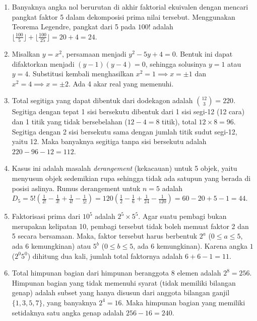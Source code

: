 \documentclass{article}
\begin{document}
\begin{enumerate}
\item Banyaknya angka nol berurutan di akhir faktorial ekuivalen dengan mencari pangkat faktor 5 dalam dekomposisi prima nilai tersebut. Menggunakan Teorema Legendre, pangkat dari 5 pada $100!$ adalah $\lfloor \frac{100}{5} \rfloor + \lfloor \frac{100}{25} \rfloor = 20 + 4 = 24$.

\item Misalkan $y = x^2$, persamaan menjadi $y^2 - 5y + 4 = 0$. Bentuk ini dapat difaktorkan menjadi $(y-1)(y-4) = 0$, sehingga solusinya $y = 1$ atau $y = 4$. Substitusi kembali menghasilkan $x^2 = 1 \implies x = \pm 1$ dan $x^2 = 4 \implies x = \pm 2$. Ada 4 akar real yang memenuhi.

\item Total segitiga yang dapat dibentuk dari dodekagon adalah $\binom{12}{3} = 220$. 
Segitiga dengan tepat 1 sisi bersekutu dibentuk dari 1 sisi segi-12 (12 cara) dan 1 titik yang tidak bersebelahan ($12-4=8$ titik), total $12 \times 8 = 96$. 
Segitiga dengan 2 sisi bersekutu sama dengan jumlah titik sudut segi-12, yaitu 12. 
Maka banyaknya segitiga tanpa sisi bersekutu adalah $220 - 96 - 12 = 112$.

\item Kasus ini adalah masalah \textit{derangement} (kekacauan) untuk 5 objek, yaitu menyusun objek sedemikian rupa sehingga tidak ada satupun yang berada di posisi aslinya. Rumus derangement untuk $n=5$ adalah $D_5 = 5! \left( \frac{1}{2!} - \frac{1}{3!} + \frac{1}{4!} - \frac{1}{5!} \right) = 120 \left( \frac{1}{2} - \frac{1}{6} + \frac{1}{24} - \frac{1}{120} \right) = 60 - 20 + 5 - 1 = 44$.

\item Faktorisasi prima dari $10^5$ adalah $2^5 \times 5^5$. Agar suatu pembagi bukan merupakan kelipatan 10, pembagi tersebut tidak boleh memuat faktor 2 dan 5 secara bersamaan. Maka, faktor tersebut harus berbentuk $2^a$ ($0 \le a \le 5$, ada 6 kemungkinan) atau $5^b$ ($0 \le b \le 5$, ada 6 kemungkinan). Karena angka $1$ ($2^0 5^0$) dihitung dua kali, jumlah total faktornya adalah $6 + 6 - 1 = 11$.

\item Total himpunan bagian dari himpunan beranggota 8 elemen adalah $2^8 = 256$. Himpunan bagian yang tidak memenuhi syarat (tidak memiliki bilangan genap) adalah subset yang hanya disusun dari anggota bilangan ganjil $\{1, 3, 5, 7\}$, yang banyaknya $2^4 = 16$. Maka himpunan bagian yang memiliki setidaknya satu angka genap adalah $256 - 16 = 240$.


\end{enumerate}
\end{document}
